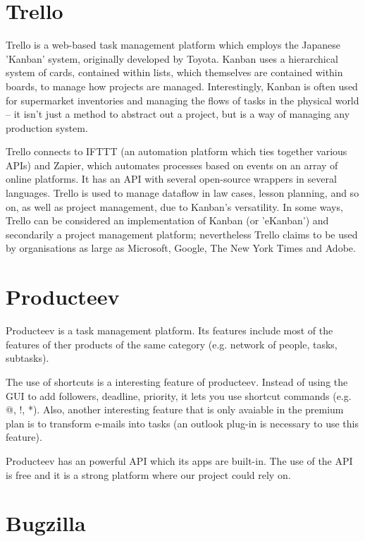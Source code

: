 \documentclass[a4paper]{l3proj}
\begin{document}
\section{Trello}
\label{trello}\par
Trello is a web-based task management platform which employs the Japanese 'Kanban'
system, originally developed by Toyota. Kanban uses a hierarchical system of
cards, contained within lists, which themselves are contained within boards, to
manage how projects are managed. Interestingly, Kanban is often used for
supermarket inventories and managing the flows of tasks in the physical world --
it isn't just a method to abstract out a project, but is a way of managing any
production system.\par
Trello connects to IFTTT (an automation platform which ties together various APIs)
and Zapier, which automates processes based on events on an array of online
platforms. It has an API with several open-source wrappers in several languages.
Trello is used to manage dataflow in law cases, lesson planning, and so on, as
well as project management, due to Kanban's versatility.
In some ways, Trello can be considered an implementation of Kanban (or 'eKanban')
and secondarily a project management platform; nevertheless Trello claims to be
used by organisations as large as Microsoft, Google, The New York Times and
Adobe. 


\section{Producteev}
\label{producteev}

Producteev is a task management platform. Its features include most of the features of ther products of the same category (e.g. network of people, tasks, subtasks).

The use of shortcuts is a interesting feature of producteev. Instead of using the GUI to add followers, deadline, priority, it lets you use shortcut commands (e.g. @, !, *). Also, another interesting feature that is only avaiable in the premium plan is to transform e-mails into tasks (an outlook plug-in is necessary to use this feature).

Producteev has an powerful API which its apps are built-in. The use of the API is free and it is a strong platform where our project could rely on.


\section{Bugzilla}
\label{Bugzilla}
\end{document}

